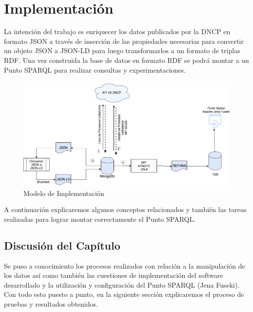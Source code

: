 \chapter{Implementación}
\label{chap:Implementación de la Ontologia}


La intención del trabajo es enriquecer los datos publicados por la DNCP en formato JSON a través de inserción de las propiedades necesarias para convertir un objeto JSON a JSON-LD para luego transformarlos a un formato de triplas RDF. Una vez construida la base de datos en formato RDF se podrá montar a un Punto SPARQL para realizar consultas y experimentaciones.


\begin{figure}[h!]
   \centering
   \includegraphics[width=150mm]{figuras/Diagramas-Implementacion.png}

   \caption{Modelo de Implementación}
   \label{img:modelo de Implementacion}
\end{figure}

A continuación explicaremos algunos conceptos relacionados y también las tareas realizadas para lograr montar correctamente el Punto SPARQL.















 \section{Discusión del Capítulo }

 Se puso a conocimiento los procesos realizados con relación a la manipulación de los datos así como también las cuestiones de implementación del software desarrollado y la utilización y configuración del Punto SPARQL (Jena Fuseki). Con todo esto puesto a punto, en la siguiente sección explicaremos el proceso de pruebas y resultados obtenidos.



